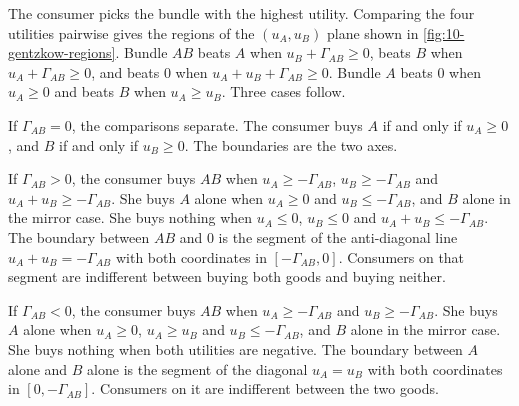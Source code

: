  The consumer picks the bundle with the highest utility. Comparing the four utilities pairwise
gives the regions of the $(u_A, u_B)$ plane shown in \cref{fig:10-gentzkow-regions}. Bundle $AB$ beats $A$ when $u_B +
\Gamma_{AB} \ge 0$, beats $B$ when $u_A + \Gamma_{AB} \ge 0$, and beats $0$ when $u_A + u_B + \Gamma_{AB} \ge 0$.
Bundle $A$ beats $0$ when $u_A \ge 0$ and beats $B$ when $u_A \ge u_B$. Three cases follow.

If $\Gamma_{AB} = 0$, the comparisons separate. The consumer buys $A$ if and only if $u_A \ge 0$, and $B$ if and only if
$u_B \ge 0$. The boundaries are the two axes.

If $\Gamma_{AB} > 0$, the consumer buys $AB$ when $u_A \ge -\Gamma_{AB}$, $u_B \ge -\Gamma_{AB}$ and $u_A + u_B \ge
-\Gamma_{AB}$. She buys $A$ alone when $u_A \ge 0$ and $u_B \le -\Gamma_{AB}$, and $B$ alone in the mirror case. She buys
nothing when $u_A \le 0$, $u_B \le 0$ and $u_A + u_B \le -\Gamma_{AB}$. The boundary between $AB$ and $0$ is the
segment of the anti-diagonal line $u_A + u_B = -\Gamma_{AB}$ with both coordinates in $[-\Gamma_{AB}, 0]$. Consumers on
that segment are indifferent between buying both goods and buying neither.

If $\Gamma_{AB} < 0$, the consumer buys $AB$ when $u_A \ge -\Gamma_{AB}$ and $u_B \ge -\Gamma_{AB}$. She buys $A$ alone
when $u_A \ge 0$, $u_A \ge u_B$ and $u_B \le -\Gamma_{AB}$, and $B$ alone in the mirror case. She buys nothing when both
utilities are negative. The boundary between $A$ alone and $B$ alone is the segment of the diagonal $u_A = u_B$ with
both coordinates in $[0, -\Gamma_{AB}]$. Consumers on it are indifferent between the two goods.

